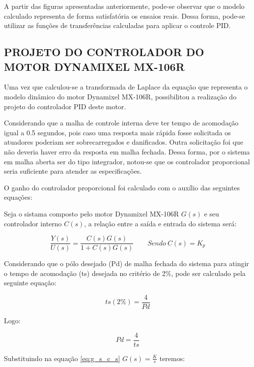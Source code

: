 \documentclass[12pt,oneside,a4paper, chapter=TITLE, section = TITLE, english, brazil]{abntex2}
\begin{document}
A partir das figuras apresentadas anteriormente, pode-se observar que o modelo calculado representa de forma satisfatória os ensaios reais. Dessa forma, pode-se utilizar as funções de transferências calculadas para aplicar o controle PID.


\subsection{PROJETO DO CONTROLADOR DO MOTOR DYNAMIXEL MX-106R}  \label{sec:proj_cont_mot} %

Uma vez que calculou-se a transformada de Laplace da equação que representa o modelo dinâmico do motor Dynamixel MX-106R, possibilitou a realização do projeto do controlador PID deste motor.

Considerando que a malha de controle interna deve ter tempo de acomodação igual a 0.5 segundos, pois caso uma resposta mais rápida fosse solicitada os atuadores poderiam ser sobrecarregados e danificados. Outra solicitação foi que não deveria haver erro da resposta em malha fechada. Dessa forma, por o sistema em malha aberta ser do tipo integrador, notou-se que os controlador proporcional seria suficiente para atender as especificações.

O ganho do controlador proporcional foi calculado com o auxílio das seguintes equações:

Seja o sistama composto pelo motor Dynamixel MX-106R \textit{$G(s)$} e seu controlador interno \textit{$C(s)$}, a relação entre a saída e entrada do sistema será:

\begin{equation}
\frac{Y(s)}{U(s)} = \frac{C(s) G(s)}{1 + C(s)G(s)} \label{eq:g_s_c_s} \qquad Sendo \ C(s) = K_{p}
\end{equation}

Considerando que o pólo desejado (Pd) de malha fechada do sistema para atingir o tempo de acomodação (ts) desejada no critério de 2\%, pode ser calculado pela seguinte equação:

\begin{equation}
ts(2\%) = \frac{4}{Pd} \label{eq:ts_2ps}
\end{equation}

Logo:

\begin{equation}
Pd = \frac{4}{ts} \label{eq:pd_2ps}
\end{equation}

Substituindo na equação \ref{eq:g_s_c_s} $G(s) = \frac{K}{s}$ teremos:
\end{document}
